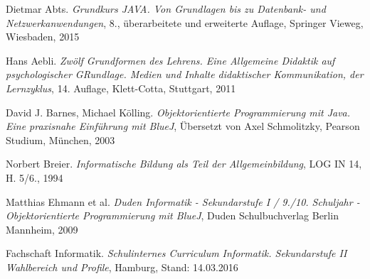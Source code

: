 \begin{thebibliography}{ABCDEF}

\renewcommand{\refname}{\normalsize Literaturverzeichnis}


Dietmar Abts. \emph{Grundkurs JAVA. Von Grundlagen bis zu Datenbank- und Netzwerkanwendungen}, 8., überarbeitete und erweiterte Auflage, Springer Vieweg, Wiesbaden, 2015

Hans Aebli. \emph{Zwölf Grundformen des Lehrens. Eine Allgemeine Didaktik auf psychologischer GRundlage. Medien und Inhalte didaktischer Kommunikation, der Lernzyklus}, 14. Auflage, Klett-Cotta, Stuttgart, 2011

David J. Barnes, Michael Kölling. \emph{Objektorientierte Programmierung mit Java. Eine praxisnahe Einführung mit BlueJ}, Übersetzt von Axel Schmolitzky, Pearson Studium, München, 2003

Norbert Breier. \emph{Informatische Bildung als Teil der Allgemeinbildung}, LOG IN 14, H. 5/6., 1994




Matthias Ehmann et al. \emph{Duden Informatik - Sekundarstufe I / 9./10. Schuljahr - Objektorientierte Programmierung mit BlueJ}, Duden Schulbuchverlag Berlin Mannheim, 2009

Fachschaft Informatik. \emph{Schulinternes Curriculum Informatik. Sekundarstufe II Wahlbereich und Profile}, Hamburg, Stand: 14.03.2016



\end{thebibliography}
